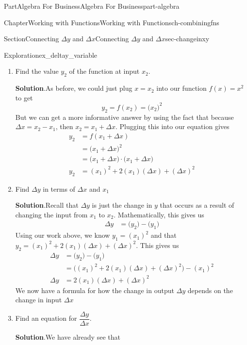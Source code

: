 \documentclass[oneside,10pt,]{tufte-book}
\newcommand{\blocktitlefont}{\relax}
\numberwithin{equation}{chapter}
\newcommand{\amp}{&}
\begin{document}
\begin{partptx}{Part}{Algebra For Business}{}{Algebra For Business}{}{}{part-algebra}
\begin{chapterptx}{Chapter}{Working with Functions}{}{Working with Functions}{}{}{ch-combiningfns}
\begin{sectionptx}{Section}{\textasteriskcentered{}Connecting \(\Delta y\) and \(\Delta x\)}{}{\textasteriskcentered{}Connecting \(\Delta y\) and \(\Delta x\)}{}{}{sec-changeinxy}
\begin{exploration}{Exploration}{}{ex_deltay_variable}
\begin{enumerate}[font=\bfseries,label=(\alph*),ref=\alph*]
\begin{equation*}
y_1 = f(x_1) = \Big(x_1\Big)^2
\end{equation*}
%
\item{}Find the value \(y_2\) of the function at input \(x_2\).%
\par\smallskip%
\noindent\textbf{\blocktitlefont Solution}.\hypertarget{ex_deltay_variable-3-2}{}\quad{}As before, we could just plug \(x=x_2\) into our function \(f(x) = x^2\) to get%
\begin{equation*}
y_2 = f(x_2) = \Big(x_2\Big)^2
\end{equation*}
But we can get a more informative answer by using the fact that because \(\Delta x = x_2 - x_1\), then \(x_2 = x_1 + \Delta x\).  Plugging this into our equation gives%
\begin{align*}
y_2 \amp = f(x_1 + \Delta x)\\
\amp = \Big(x_1 + \Delta x\Big)^2 \\
\amp = \Big(x_1 + \Delta x\Big)\cdot \Big(x_1 + \Delta x\Big)\\
y_2 \amp = (x_1)^2 + 2(x_1)(\Delta x) + (\Delta x)^2
\end{align*}
%
\item{}Find \(\Delta y\) in terms of \(\Delta x\) and \(x_1\)%
\par\smallskip%
\noindent\textbf{\blocktitlefont Solution}.\hypertarget{ex_deltay_variable-4-2}{}\quad{}Recall that \(\Delta y\) is just the change in \(y\) that occurs as a result of changing the input from \(x_1\) to \(x_2\).  Mathematically, this gives us%
\begin{align*}
\Delta y \amp = \Big(y_2\Big) - \Big(y_1\Big)
\end{align*}
Using our work above, we know \(y_1 = (x_1)^2\) and that \(y_2 = (x_1)^2 + 2(x_1)(\Delta x) + (\Delta x)^2\).  This gives us%
\begin{align*}
\Delta y \amp = \Big(y_2\Big) - \Big(y_1\Big)\\
\amp = \Big((x_1)^2 + 2(x_1)(\Delta x) + (\Delta x)^2\Big) - (x_1)^2\\
\Delta y \amp = 2(x_1)(\Delta x)+(\Delta x)^2
\end{align*}
We now have a formula for how the change in output \(\Delta y\) depends on the change in input \(\Delta x\)%
\item{}Find an equation for \(\dfrac{\Delta y}{\Delta x}\).%
\par\smallskip%
\noindent\textbf{\blocktitlefont Solution}.\hypertarget{ex_deltay_variable-5-2}{}\quad{}We have already see that%

\end{enumerate}
\end{exploration}
\end{sectionptx}
\end{chapterptx}
\end{partptx}
\end{document}
